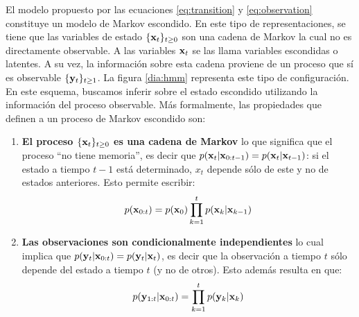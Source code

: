 El modelo propuesto por las ecuaciones \ref{eq:transition} y \ref{eq:observation} constituye un modelo de Markov escondido. En este tipo de representaciones, se tiene que las variables de estado $\{\mathbf{x}_t\}_{t \ge 0}$ son una cadena de Markov la cual no es directamente observable. A las variables $\mathbf{x}_t$ se las llama variables escondidas o latentes. A su vez, la información sobre esta cadena proviene de un proceso que sí es observable $\{\mathbf{y}_t\}_{t \ge 1}$. La figura \ref{dia:hmm} representa este tipo de configuración. En este esquema, buscamos inferir sobre el estado escondido utilizando la información del proceso observable. Más formalmente, las propiedades que definen a un proceso de Markov escondido son: 
\begin{enumerate}
    \item \textbf{El proceso $\{\mathbf{x}_t\}_{t \ge 0}$ es una cadena de Markov} lo que significa que el proceso ``no tiene memoria'', es decir que $p(\mathbf{x}_t | \mathbf{x}_{0:t-1}) = p(\mathbf{x}_t | \mathbf{x}_{t-1})$: si el estado a tiempo $t-1$ está determinado, $x_t$ depende sólo de este y no de estados anteriores. Esto permite escribir:
    \begin{align*}
        p(\mathbf{x}_{0:t}) = p(\mathbf{x}_0) \prod_{k=1}^{t} p(\mathbf{x}_k | \mathbf{x}_{k-1})
    \end{align*}
    \item \textbf{Las observaciones son condicionalmente independientes}  lo cual implica que $p(\mathbf{y}_t | \mathbf{x}_{0:t}) = p(\mathbf{y}_t | \mathbf{x}_t)$, es decir que la observación a tiempo $t$ sólo depende del estado a tiempo $t$ (y no de otros). Esto además resulta en que:
    \begin{align*}
        p(\mathbf{y}_{1:t} | \mathbf{x}_{0:t}) = \prod_{k=1}^{t} p(\mathbf{y}_k | \mathbf{x}_k)
    \end{align*}
\end{enumerate}

